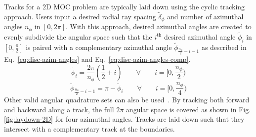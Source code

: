 Tracks for a 2D \ac{MOC} problem are typically laid down using the cyclic tracking approach. Users input a desired radial ray spacing $\tilde{\delta}_\phi$ and number of azimuthal angles $n_{\phi}$ in $[0, 2 \pi]$. With this approach, desired azimuthal angles are created to evenly subdivide the angular space such that the $i^{\text{th}}$ desired azimuthal angle $\tilde{\phi}_i$ in $[0, \frac{\pi}{2}]$ is paired with a complementary azimuthal angle $\tilde{\phi}_{\frac{n_{\phi}}{2} - i - 1}$ as described in Eq.~\ref{eq:disc-azim-angles} and Eq.~\ref{eq:disc-azim-angles-comp}.
\begin{equation}
\tilde{\phi}_i = \frac{2 \pi}{n_\phi} \left(\frac{1}{2} + i\right) \qquad \forall \qquad i = \Big[0,\frac{n_{\phi}}{2}\Big)
\label{eq:disc-azim-angles}
\end{equation}
\begin{equation}
\tilde{\phi}_{\frac{n_{\phi}}{2} - i - 1} = \pi - \tilde{\phi}_i \qquad \forall \qquad i= \Big[0,\frac{n_{\phi}}{4}\Big)
\label{eq:disc-azim-angles-comp}
\end{equation} 
Other valid angular quadrature sets can also be used~\cite{3D-MOC-annals}. By tracking both forward and backward along a track, the full $2 \pi$ angular space is covered as shown in Fig. \ref{fig:laydown-2D} for four azimuthal angles. Tracks are laid down such that they intersect with a complementary track at the boundaries. 

